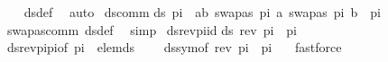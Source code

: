 \begin{isabellebody}
%
\isadelimproof
\ \ %
\endisadelimproof
%
\isatagproof
{}\isamarkupfalse%
\ ds{\isacharunderscore}{\kern0pt}def\ \isamarkupfalse%
\ auto%
\endisatagproof
{\isafoldproof}%
%
\isadelimproof
\isanewline
%
\endisadelimproof
\isanewline
{}\isamarkupfalse%
\ ds{\isacharunderscore}{\kern0pt}comm{\isacharcolon}{\kern0pt}\isanewline
{\isachardoublequoteopen}ds\ {\isacharparenleft}{\kern0pt}pi\ {\isacharat}{\kern0pt}\ {\isacharbrackleft}{\kern0pt}{\isacharparenleft}{\kern0pt}a{\isacharcomma}{\kern0pt}b{\isacharparenright}{\kern0pt}{\isacharbrackright}{\kern0pt}{\isacharparenright}{\kern0pt}\ {\isacharparenleft}{\kern0pt}{\isacharbrackleft}{\kern0pt}{\isacharparenleft}{\kern0pt}swapas\ pi\ a{\isacharcomma}{\kern0pt}\ swapas\ pi\ b{\isacharparenright}{\kern0pt}{\isacharbrackright}{\kern0pt}\ {\isacharat}{\kern0pt}\ pi{\isacharparenright}{\kern0pt}\ {\isacharequal}{\kern0pt}\ {\isacharbraceleft}{\kern0pt}{\isacharbraceright}{\kern0pt}{\isachardoublequoteclose}\isanewline
%
\isadelimproof
\ \ %
\endisadelimproof
%
\isatagproof
{}\isamarkupfalse%
\ swapas{\isacharunderscore}{\kern0pt}comm\ ds{\isacharunderscore}{\kern0pt}def\ \isamarkupfalse%
\ simp%
\endisatagproof
{\isafoldproof}%
%
\isadelimproof
\isanewline
%
\endisadelimproof
\isanewline
{}\isamarkupfalse%
\ ds{\isacharunderscore}{\kern0pt}rev{\isacharunderscore}{\kern0pt}pi{\isacharunderscore}{\kern0pt}id{\isacharcolon}{\kern0pt}\isanewline
{\isachardoublequoteopen}ds\ {\isacharparenleft}{\kern0pt}rev\ pi\ {\isacharat}{\kern0pt}\ pi{\isacharparenright}{\kern0pt}\ {\isacharbrackleft}{\kern0pt}{\isacharbrackright}{\kern0pt}\ {\isacharequal}{\kern0pt}\ {\isacharbraceleft}{\kern0pt}{\isacharbraceright}{\kern0pt}{\isachardoublequoteclose}\isanewline
%
\isadelimproof
\ \ %
\endisadelimproof
%
\isatagproof
{}\isamarkupfalse%
\ ds{\isacharunderscore}{\kern0pt}rev{\isacharunderscore}{\kern0pt}pi{\isacharunderscore}{\kern0pt}pi{\isacharbrackleft}{\kern0pt}of\ pi\ {\isacartoucheopen}{\isacharbrackleft}{\kern0pt}{\isacharbrackright}{\kern0pt}{\isacartoucheclose}{\isacharbrackright}{\kern0pt}\ elem{\isacharunderscore}{\kern0pt}ds\isanewline
\ \ \ \ ds{\isacharunderscore}{\kern0pt}sym{\isacharbrackleft}{\kern0pt}of\ {\isacartoucheopen}{\isacharparenleft}{\kern0pt}rev\ pi\ {\isacharat}{\kern0pt}\ pi{\isacharparenright}{\kern0pt}{\isacartoucheclose}\ {\isacartoucheopen}{\isacharbrackleft}{\kern0pt}{\isacharbrackright}{\kern0pt}{\isacartoucheclose}{\isacharbrackright}{\kern0pt}\ \isamarkupfalse%
\ fastforce%

\end{isabellebody}
